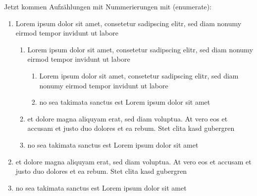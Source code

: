 Jetzt kommen Aufzählungen mit Nummerierungen mit (enumerate):
\begin{enumerate}
\item
Lorem ipsum dolor sit amet, consetetur sadipscing elitr, sed diam nonumy eirmod tempor invidunt ut labore
   \begin{enumerate}
   \item
Lorem ipsum dolor sit amet, consetetur sadipscing elitr, sed diam nonumy eirmod tempor invidunt ut labore
      \begin{enumerate}
      \item
Lorem ipsum dolor sit amet, consetetur sadipscing elitr, sed diam nonumy eirmod tempor invidunt ut labore
      \item
no sea takimata sanctus est Lorem ipsum dolor sit amet
      \end{enumerate}
\item
et dolore magna aliquyam erat, sed diam voluptua. At vero eos et accusam et justo duo dolores et ea rebum. Stet clita kasd gubergren
   \item
no sea takimata sanctus est Lorem ipsum dolor sit amet
   \end{enumerate}
\item
et dolore magna aliquyam erat, sed diam voluptua. At vero eos et accusam et justo duo dolores et ea rebum. Stet clita kasd gubergren
\item
no sea takimata sanctus est Lorem ipsum dolor sit amet
\end{enumerate}
